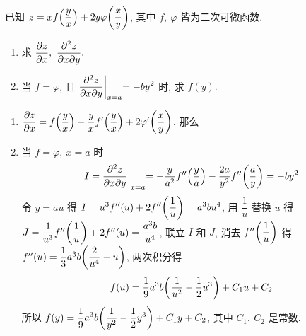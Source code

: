 \begin{example}
    已知 $z=xf\qty(\dfrac{y}{x})+2y\varphi\qty(\dfrac{x}{y})$, 其中 $f,~\varphi$ 皆为二次可微函数.
    \begin{enumerate}[label=(\arabic{*})]
        \item 求 $\displaystyle \pdv{z}{x},~\pdv{z}{x}{y}.$
        \item 当 $f=\varphi$, 且 $\displaystyle \pdv{z}{x}{y}\biggl |_{x=a}=-by^2$ 时, 求 $f(y).$
    \end{enumerate}
\end{example}
\begin{solution}
    \begin{enumerate}[label=(\arabic{*})]
        \item $\displaystyle\pdv{z}{x}=f\qty(\dfrac{y}{x})-\dfrac{y}{x}f'\qty(\dfrac{y}{x})+2\varphi'\qty(\dfrac{x}{y})$, 那么
        \item 当 $f=\varphi,~x=a$ 时
              $$I=\pdv{z}{x}{y}\biggl |_{x=a}=-\dfrac{y}{a^2}f''\qty(\dfrac{y}{a})-\dfrac{2a}{y^2}f''\qty(\dfrac{a}{y})=-by^2$$
              令 $y=au$ 得 $\displaystyle I=u^3f''(u)+2f''\qty(\dfrac{1}{u})=a^3bu^4$, 用 $\dfrac{1}{u}$ 替换 $u$ 得 $J=\dfrac{1}{u^3}f''\qty(\dfrac{1}{u})+2f''(u)=\dfrac{a^3b}{u^4}$,
              联立 $I$ 和 $J$, 消去 $f''\qty(\dfrac{1}{u})$ 得 $f''(u)=\dfrac{1}{3}a^3b\qty(\dfrac{2}{u^4}-u)$, 两次积分得
              $$f(u)=\dfrac{1}{9}a^3b\qty(\dfrac{1}{u^2}-\dfrac{1}{2}u^3)+C_1u+C_2$$
              所以 $\displaystyle f(y)=\dfrac{1}{9}a^3b\qty(\dfrac{1}{y^2}-\dfrac{1}{2}y^3)+C_1y+C_2$, 其中 $C_1,~C_2$ 是常数.
    \end{enumerate}
\end{solution}

